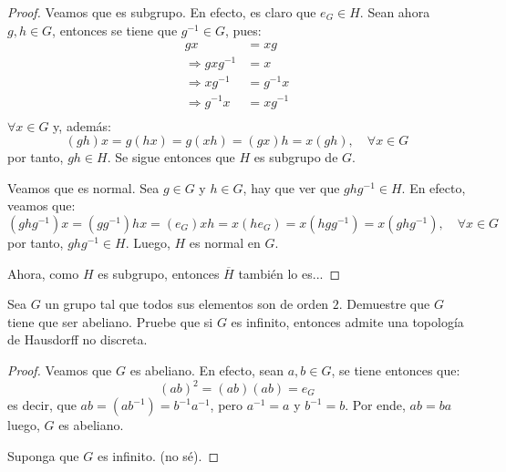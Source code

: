 \documentclass[12pt]{report}
\theoremstyle{largebreak}
\newcommand{\Cls}[1]{\ensuremath{\overline{#1}}}
\begin{document}
    \begin{proof}
        Veamos que es subgrupo. En efecto, es claro que $e_G\in H$. Sean ahora $g,h\in G$, entonces se tiene que $g^{-1}\in G$, pues:
        \begin{equation*}
            \begin{split}
                gx&=xg\\
                \Rightarrow gxg^{-1}&=x\\
                \Rightarrow xg^{-1}&=g^{-1}x\\
                \Rightarrow g^{-1}x&=xg^{-1}\\\
            \end{split}
        \end{equation*}
        $\forall x\in G$ y, además:
        \begin{equation*}
            (gh)x=g(hx)=g(xh)=(gx)h=x(gh),\quad\forall x\in G
        \end{equation*}
        por tanto, $gh\in H$. Se sigue entonces que $H$ es subgrupo de $G$.

        Veamos que es normal. Sea $g\in G$ y $h\in G$, hay que ver que $ghg^{-1}\in H$. En efecto, veamos que:
        \begin{equation*}
            (ghg^{-1})x=(gg^{-1})hx=(e_G)xh=x(he_G)=x(hgg^{-1})=x(ghg^{-1}),\quad\forall x\in G
        \end{equation*}
        por tanto, $ghg^{-1}\in H$. Luego, $H$ es normal en $G$.

        Ahora, como $H$ es subgrupo, entonces $\Cls{H}$ también lo es...
    \end{proof}

    \begin{excer}
        Sea $G$ un grupo tal que todos sus elementos son de orden $2$. Demuestre que $G$ tiene que ser abeliano. Pruebe que si $G$ es infinito, entonces admite una topología de Hausdorff no discreta.
    \end{excer}

    \begin{proof}
        Veamos que $G$ es abeliano. En efecto, sean $a,b\in G$, se tiene entonces que:
        \begin{equation*}
            (ab)^2=(ab)(ab)=e_G
        \end{equation*}
        es decir, que $ab=(ab^{-1})=b^{-1}a^{-1}$, pero $a^{-1}=a$ y $b^{-1}=b$. Por ende, $ab=ba$ luego, $G$ es abeliano.

        Suponga que $G$ es infinito. (no sé).
    \end{proof}
\end{document}
